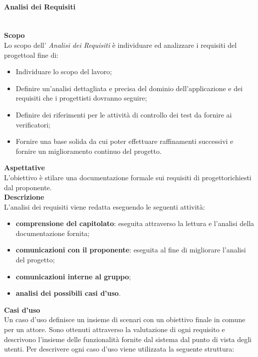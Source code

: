 \paragraph{Analisi dei Requisiti}\mbox{}\\ [1mm]
\textbf{Scopo}\\ 
Lo scopo dell' \textit{Analisi dei Requisiti} è individuare ed analizzare i requisiti del progetto\glosp al fine di:
\begin{itemize}
	\item Individuare lo scopo del lavoro;
	\item Definire un'analisi dettagliata e precisa del dominio dell'applicazione e dei requisiti che i progettisti dovranno seguire;
	\item Definire dei riferimenti per le attività di controllo dei test da fornire ai verificatori;
	\item Fornire una base solida da cui poter effettuare raffinamenti successivi e fornire un miglioramento continuo del progetto\glo.
\end{itemize}
\textbf{Aspettative}\\
L'obiettivo è stilare una documentazione formale sui requisiti di progetto\glosp richiesti dal proponente. \\
\textbf{Descrizione}\\
L'analisi dei requisiti viene redatta eseguendo le seguenti attività:
\begin{itemize}
	\item \textbf{comprensione del capitolato}\glo: eseguita attraverso la lettura e l'analisi della documentazione fornita;
	\item \textbf{comunicazioni con il proponente}: eseguita al fine di migliorare l'analisi del progetto;
	\item \textbf{comunicazioni interne al gruppo};
	\item \textbf{analisi dei possibili casi d'uso\glo}.
\end{itemize}
\textbf{Casi d'uso\glo}\\
Un caso d'uso definisce un insieme di scenari con un obiettivo finale in comune per un attore. Sono ottenuti attraverso la valutazione di ogni requisito e descrivono l'insieme delle funzionalità fornite dal sistema dal punto di vista degli utenti.
Per descrivere ogni caso d'uso viene utilizzata la seguente struttura:
